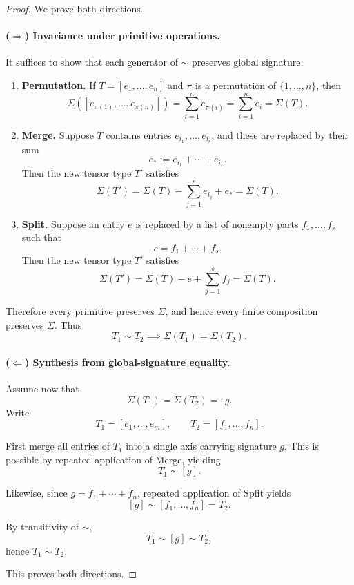 \documentclass[11pt,a4paper]{article}
\begin{document}
\begin{proof}
We prove both directions.

\paragraph{(\(\Rightarrow\)) Invariance under primitive operations.}
It suffices to show that each generator of \(\sim\) preserves global signature.

\begin{enumerate}
\item \textbf{Permutation.} If \(T=[e_1,\dots,e_n]\) and \(\pi\) is a permutation of \(\{1,\dots,n\}\), then
\[
\Sigma([e_{\pi(1)},\dots,e_{\pi(n)}])
=
\sum_{i=1}^n e_{\pi(i)}
=
\sum_{i=1}^n e_i
=
\Sigma(T).
\]

\item \textbf{Merge.} Suppose \(T\) contains entries \(e_{i_1},\dots,e_{i_r}\), and these are replaced by their sum
\[
e_* := e_{i_1}+\cdots+e_{i_r}.
\]
Then the new tensor type \(T'\) satisfies
\[
\Sigma(T')
=
\Sigma(T)-\sum_{j=1}^r e_{i_j}+e_*
=
\Sigma(T).
\]

\item \textbf{Split.} Suppose an entry \(e\) is replaced by a list of nonempty parts \(f_1,\dots,f_s\) such that
\[
e = f_1+\cdots+f_s.
\]
Then the new tensor type \(T'\) satisfies
\[
\Sigma(T')
=
\Sigma(T)-e+\sum_{j=1}^s f_j
=
\Sigma(T).
\]
\end{enumerate}

Therefore every primitive preserves \(\Sigma\), and hence every finite composition preserves \(\Sigma\). Thus
\[
T_1 \sim T_2 \implies \Sigma(T_1)=\Sigma(T_2).
\]

\paragraph{(\(\Leftarrow\)) Synthesis from global-signature equality.}
Assume now that
\[
\Sigma(T_1)=\Sigma(T_2)=:g.
\]
Write
\[
T_1=[e_1,\dots,e_m], \qquad T_2=[f_1,\dots,f_n].
\]

First merge all entries of \(T_1\) into a single axis carrying signature \(g\). This is possible by repeated application of \(\mathrm{Merge}\), yielding
\[
T_1 \sim [g].
\]

Likewise, since \(g=f_1+\cdots+f_n\), repeated application of \(\mathrm{Split}\) yields
\[
[g] \sim [f_1,\dots,f_n]=T_2.
\]

By transitivity of \(\sim\),
\[
T_1 \sim [g] \sim T_2,
\]
hence \(T_1 \sim T_2\).

This proves both directions.
\end{proof}
\end{document}
